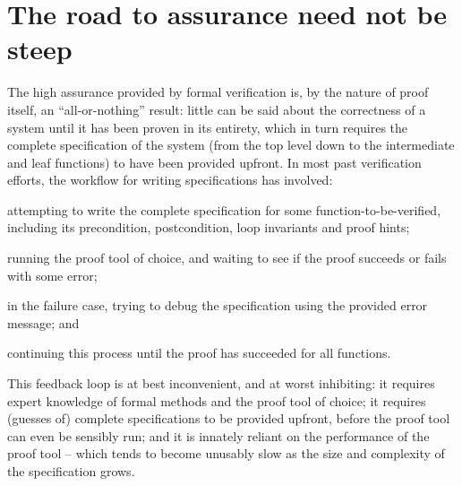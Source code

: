 \documentclass[withindex,glossary]{cam-thesis}
\newcommand\TODO[1]{}
\newcommand\TODO[1]{{\color{violet}TODO: #1}}
\begin{document}
\section{The road to assurance need not be steep}
\TODO{This assumes code-first. Rephrase to be more general}
The high assurance provided by formal verification is, by the nature of proof itself, an ``all-or-nothing'' result: little can be said about the correctness of a system until it has been proven in its entirety, which in turn requires the complete specification of the system (from the top level down to the intermediate and leaf functions) to have been provided upfront. In most past verification efforts, the workflow for writing specifications has involved:
\begin{enumerate*}[label=(\arabic*)]
  \item attempting to write the complete specification for some function-to-be-verified, including its precondition, postcondition, loop invariants and proof hints;
  \item running the proof tool of choice, and waiting to see if the proof succeeds or fails with some error;
  \item in the failure case, trying to debug the specification using the provided error message; and
  \item continuing this process until the proof has succeeded for all functions.
\end{enumerate*}
This feedback loop is at best inconvenient, and at worst inhibiting: it requires expert knowledge of formal methods and the proof tool of choice; it requires (guesses of) complete specifications to be provided upfront, before the proof tool can even be sensibly run; and it is innately reliant on the performance of the proof tool -- which tends to become unusably slow as the size and complexity of the specification grows. \TODO{Pictures of the two different workflows? Latex diagrams?}
\end{document}
